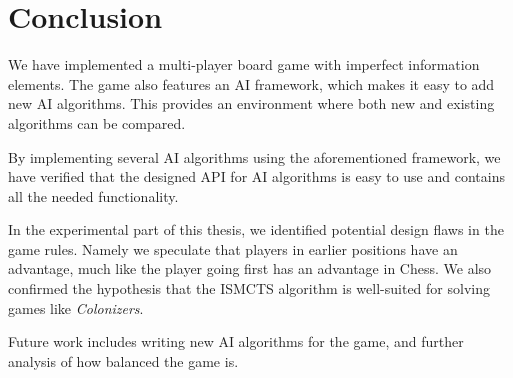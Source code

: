\chapter*{Conclusion}

We have implemented a multi-player board game with imperfect information
elements. The game also features an AI framework, which makes it
easy to add new AI algorithms. This provides an environment where
both new and existing algorithms can be compared.

By implementing several AI algorithms using the aforementioned framework,
we have verified that the designed API for AI algorithms is easy to use
and contains all the needed functionality.

In the experimental part of this thesis, we identified potential design flaws
in the game rules. Namely we speculate that players in earlier positions
have an advantage, much like the player going first has an advantage in Chess.
We also confirmed the hypothesis that the
ISMCTS algorithm is well-suited for solving games like \emph{Colonizers}.

Future work includes writing new AI algorithms for the game, and further
analysis of how balanced the game is.
